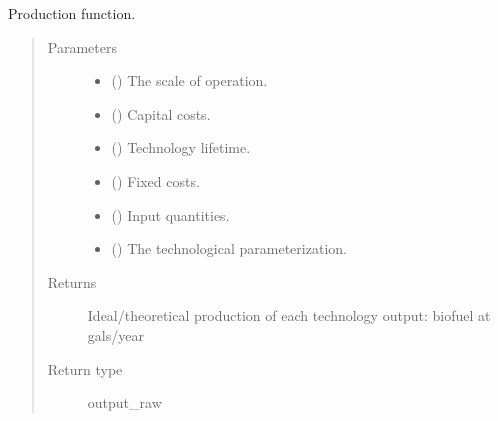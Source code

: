 \documentclass[letterpaper,10pt,english]{sphinxmanual}
\begin{document}
\begin{fulllineitems}
\label{\detokenize{technology:technology.tutorial_biorefinery.production}}
Production function.
\begin{quote}\begin{description}
\item[{Parameters}] \leavevmode\begin{itemize}
\item {} 
 () \textendash{} The scale of operation.

\item {} 
 () \textendash{} Capital costs.

\item {} 
 () \textendash{} Technology lifetime.

\item {} 
 () \textendash{} Fixed costs.

\item {} 
 () \textendash{} Input quantities.

\item {} 
 () \textendash{} The technological parameterization.

\end{itemize}

\item[{Returns}] \leavevmode
Ideal/theoretical production of each technology output: biofuel at
gals/year

\item[{Return type}] \leavevmode
output\_raw

\end{description}\end{quote}

\end{fulllineitems}
\end{document}
